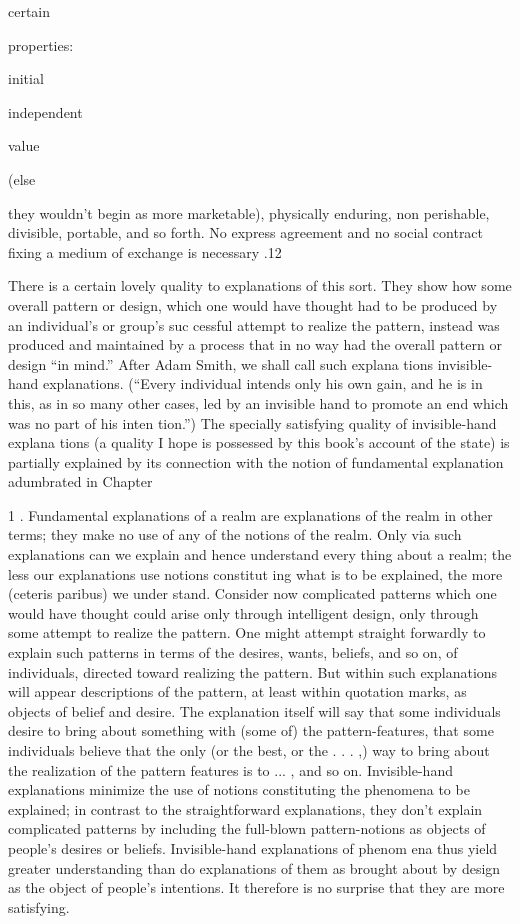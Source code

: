 \documentclass[11pt,openany]{book}
\begin{document}
certain 

properties: 

initial 

independent 

value 

(else 

they wouldn't begin as more marketable), physically enduring, non perishable, divisible, portable, and so forth. No express agreement and no social contract fixing a medium of exchange is necessary .12 

There is a certain lovely quality to explanations of this sort. They show how some overall pattern or design, which one would have thought had to be produced by an individual's or group's suc cessful attempt to realize the pattern, instead was produced and maintained by a process that in no way had the overall pattern or design ``in mind.'' After Adam Smith, we shall call such explana tions invisible-hand explanations. (``Every individual intends only his own gain, and he is in this, as in so many other cases, led by an invisible hand to promote an end which was no part of his inten tion.'') The specially satisfying quality of invisible-hand explana tions (a quality I hope is possessed by this book's account of the state) is partially explained by its connection with the notion of fundamental explanation adumbrated in Chapter 

1 . Fundamental explanations of a realm are explanations of the realm in other terms; they make no use of any of the notions of the realm. Only via such explanations can we explain and hence understand every thing about a realm; the less our explanations use notions constitut ing what is to be explained, the more (ceteris paribus) we under stand. Consider now complicated patterns which one would have thought could arise only through intelligent design, only through some attempt to realize the pattern. One might attempt straight forwardly to explain such patterns in terms of the desires, wants, beliefs, and so on, of individuals, directed toward realizing the pattern. But within such explanations will appear descriptions of the pattern, at least within quotation marks, as objects of belief and desire. The explanation itself will say that some individuals desire to bring about something with (some of) the pattern-features, that some individuals believe that the only (or the best, or the . . . ,) way to bring about the realization of the pattern features is to ... , and so on. Invisible-hand explanations minimize the use of notions constituting the phenomena to be explained; in contrast to the straightforward explanations, they don't explain complicated patterns by including the full-blown pattern-notions as objects of people's desires or beliefs. Invisible-hand explanations of phenom ena thus yield greater understanding than do explanations of them as brought about by design as the object of people's intentions. It therefore is no surprise that they are more satisfying. 
\end{document}
